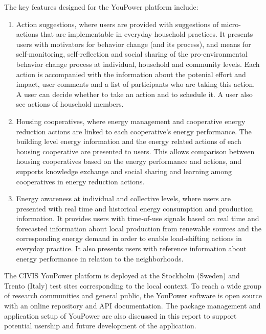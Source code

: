 The key features designed for the YouPower platform include: 

\begin{enumerate}
\item Action suggestions, where users are provided with suggestions of micro-actions that are implementable in everyday household practices. 
% 
It presents users with motivators for behavior change (and its process), and means for self-monitoring, self-reflection and social sharing of the pro-environmental behavior change process at individual, household and community levels. 
Each action is accompanied with the information about the potenial effort and impact, user comments and a list of participants who are taking this action. A user can decide whether to take an action and to schedule it. A user also see actions of household members. 

\item Housing cooperatives, where energy management and cooperative energy reduction actions are linked to each cooperative's energy performance. 
% 
The building level energy information and the energy related actions of each housing cooperative are presented to users. This allows comparison between housing cooperatives based on the energy performance and actions, and supports knowledge exchange and social sharing and learning among cooperatives in energy reduction actions.

\item Energy awareness at individual and collective levels, where users are presented with real time and historical energy consumption and production information. 
% 
It provides users with time-of-use signals based on real time and forecasted information about local production from renewable sources and the corresponding energy demand in order to enable load-shifting actions in everyday practice. It also presents users with reference information about energy performance in relation to the neighborhoods. 

\end{enumerate}

The CIVIS YouPower platform is deployed at the Stockholm (Sweden) and Trento (Italy)
test sites corresponding to the local context. To reach a wide group of research communities and general public, the YouPower software is open source with an online repository and API documentation. The package management and application setup of YouPower are also discussed in this report to support potential usership and future development of the application. 
